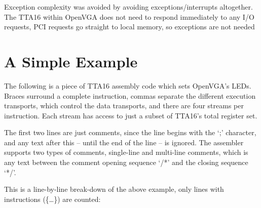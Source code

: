Exception complexity was avoided by avoiding exceptions/interrupts altogether.
The TTA16 within OpenVGA does not need to respond immediately to any I/O
requests, PCI requests go straight to local memory, so exceptions are not needed


\section{A Simple Example}
The following is a piece of TTA16 assembly code which sets OpenVGA's LEDs.
Braces surround a complete instruction, commas separate the different execution
transports, which control the data transports, and there are four streams per
instruction. Each stream has access to just a subset of TTA16's total register set.

\footnotesize

\normalsize

The first two lines are just comments, since the line begins with the `;'
character, and any text after this -- until the end of the line -- is ignored.
The assembler supports two types of comments, single-line and multi-line
comments, which is any text between the comment opening sequence `/*' and the
closing sequence `*/'.

This is a line-by-line break-down of the above example, only lines with
instructions (\{\ldots\}) are counted:

